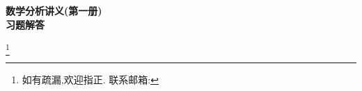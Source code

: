 \documentclass[lang=cn,12pt,scheme=chinese,founder,mode=simple,black]{elegantbook}
\newcommand\blfootnote[1]{%
    \begingroup
    \renewcommand\thefootnote{}%
    \footnote{#1}%
    \addtocounter{footnote}{-1}%
    \endgroup
}
\begin{document}
\begin{titlepage}
    \vspace*{\fill} %
    \begin{center}
        {\Huge \textbf{数学分析讲义(第一册)}} \\[0.5cm]

        {\Huge \textbf{习题解答}} \\[1cm]

        \date{\today}

    \end{center}
    \vspace*{\fill} %

    \blfootnote{如有疏漏,欢迎指正. 联系邮箱: }
\end{titlepage}

\tableofcontents

\mainmatter





% 
% 
% 
\end{document}
